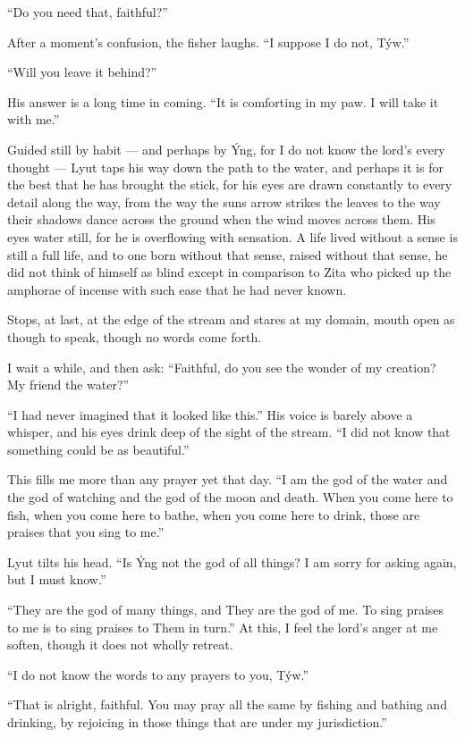 ``Do you need that, faithful?''

After a moment's confusion, the fisher laughs. ``I suppose I do not, Týw.''

``Will you leave it behind?''

His answer is a long time in coming. ``It is comforting in my paw. I will take it with me.''

Guided still by habit --- and perhaps by Ýng, for I do not know the lord's every thought --- Lyut taps his way down the path to the water, and perhaps it is for the best that he has brought the stick, for his eyes are drawn constantly to every detail along the way, from the way the suns arrow strikes the leaves to the way their shadows dance across the ground when the wind moves across them. His eyes water still, for he is overflowing with sensation. A life lived without a sense is still a full life, and to one born without that sense, raised without that sense, he did not think of himself as blind except in comparison to Zita who picked up the amphorae of incense with such ease that he had never known.

Stops, at last, at the edge of the stream and stares at my domain, mouth open as though to speak, though no words come forth.

I wait a while, and then ask: ``Faithful, do you see the wonder of my creation? My friend the water?''

``I had never imagined that it looked like this.'' His voice is barely above a whisper, and his eyes drink deep of the sight of the stream. ``I did not know that something could be as beautiful.''

This fills me more than any prayer yet that day. ``I am the god of the water and the god of watching and the god of the moon and death. When you come here to fish, when you come here to bathe, when you come here to drink, those are praises that you sing to me.''

Lyut tilts his head. ``Is Ýng not the god of all things? I am sorry for asking again, but I must know.''

``They are the god of many things, and They are the god of me. To sing praises to me is to sing praises to Them in turn.'' At this, I feel the lord's anger at me soften, though it does not wholly retreat.

``I do not know the words to any prayers to you, Týw.''

``That is alright, faithful. You may pray all the same by fishing and bathing and drinking, by rejoicing in those things that are under my jurisdiction.''


